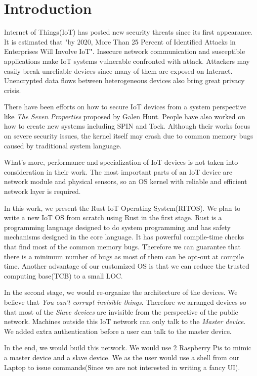 \section{Introduction}

Internet of Things(IoT) has posted new security threats since its first appearance. It is estimated that "by 2020, More Than 25 Percent of Identified Attacks in Enterprises Will Involve IoT"\cite{gartner2016gartner}. Insecure network communication and susceptible applications make IoT systems vulnerable confronted with attack. Attackers may easily break unreliable devices since many of them are exposed on Internet\cite{kolias2017ddos}. Unencrypted data flows between heterogeneous devices also bring great privacy crisis\cite{khan2018iot}.


There have been efforts on how to secure IoT devices from a system perspective like \textit{The Seven Properties}\cite{hunt2017the} proposed by Galen Hunt. People have also worked on how to create new systems including SPIN\cite{hesselman2017spin} and Tock\cite{levy2017tock}. Although their works focus on severe security issues, the kernel itself may crash due to common memory bugs caused by traditional system language.

What's more, performance and specialization of IoT devices is not taken into consideration in their work. The most important parts of an IoT device are network module and physical sensors, so an OS kernel with reliable and efficient network layer is required.



In this work, we present the Rust IoT Operating System(RITOS).
We plan to write a new IoT OS from scratch using Rust in the first stage.
Rust is a programming language designed to do system programming and has safety mechanisms designed in the core language.
It has powerful compile-time checks that find most of the common memory bugs.
Therefore we can guarantee that there is a minimum number of bugs as most of them can be opt-out at compile time. 
Another advantage of our customized OS is that we can reduce the trusted computing base(TCB) to a small LOC.

In the second stage, we would re-organize the architecture of the devices.
We believe that \textit{You can't corrupt invisible things}.
Therefore we arranged devices so that most of the \textit{Slave devices} are invisible from the perspective of the public network.
Machines outside this IoT network can only talk to the \textit{Master device}.
We added extra authentication before a user can talk to the master device.


In the end, we would build this network. 
We would use 2 Raspberry Pis to mimic a master device and a slave device. 
We as the user would use a shell from our Laptop to issue commands(Since we are not interested in writing a fancy UI).